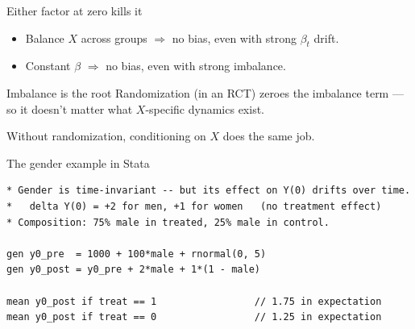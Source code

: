 \documentclass[aspectratio=169,11pt]{beamer}
\begin{document}
\begin{frame}{Either factor at zero kills it}
\vspace{0.8em}
\begin{itemize}\setlength\itemsep{1.2em}
  \item Balance $X$ across groups \;$\Rightarrow$\; no bias, even with strong $\beta_t$ drift.
  \item Constant $\beta$ \;$\Rightarrow$\; no bias, even with strong imbalance.
\end{itemize}
\end{frame}

\begin{frame}{Imbalance is the root}
\vspace{0.6em}
Randomization (in an RCT) zeroes the imbalance term --- so it doesn't matter what $X$-specific dynamics exist.

\vspace{1.2em}
Without randomization, conditioning on $X$ does the same job.

\vspace{0.8em}
\begin{center}
\end{center}
\end{frame}

\begin{frame}[fragile]{The gender example in Stata}
\footnotesize
\begin{lstlisting}[language={[ANSI]C},basicstyle=\ttfamily\scriptsize]
* Gender is time-invariant -- but its effect on Y(0) drifts over time.
*   delta Y(0) = +2 for men, +1 for women   (no treatment effect)
* Composition: 75% male in treated, 25% male in control.

gen y0_pre  = 1000 + 100*male + rnormal(0, 5)
gen y0_post = y0_pre + 2*male + 1*(1 - male)

mean y0_post if treat == 1                 // 1.75 in expectation
mean y0_post if treat == 0                 // 1.25 in expectation
\end{lstlisting}

\vspace{0.6em}
\begin{center}
\end{center}
\end{frame}
\end{document}

